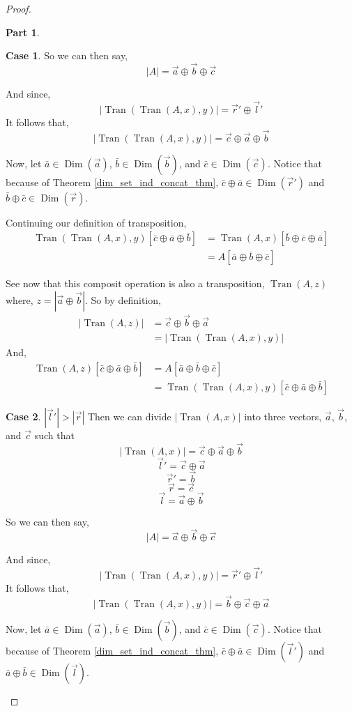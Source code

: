 \documentclass[12pt]{book}
\theoremstyle{plain}
\theoremstyle{definition}
\theoremstyle{ppart}
\newtheorem{ppart}{Part}
\theoremstyle{case}
\newtheorem{case}{Case}
\theoremstyle{solution}
\DeclareMathOperator{\Dim}{Dim}
\DeclareMathOperator{\Tran}{Tran}
\newcommand{\shape}[1]{\left|#1\right|}
\begin{document}
\begin{proof}
\begin{ppart}
\begin{case}
So we can then say,
\[ \shape{A} = \vec{a} \oplus \vec{b} \oplus \vec{c} \]

And since,
\[ \shape{\Tran(\Tran(A, x), y)} = \vec{r}' \oplus \vec{l}' \]
It follows that,
\[ \shape{\Tran(\Tran(A, x), y)} = \vec{c} \oplus \vec{a} \oplus \vec{b} \]

Now, let $\bar{a} \in \Dim(\vec{a})$, $\bar{b} \in \Dim(\vec{b})$, and
$\bar{c} \in \Dim(\vec{c})$. Notice that because of Theorem 
\ref{dim_set_ind_concat_thm}, $\bar{c} \oplus \bar{a} \in \Dim(\vec{r}')$ and
$\bar{b} \oplus \bar{c} \in \Dim(\vec{r})$.

Continuing our definition of transposition,
\begin{align*}
  \Tran(\Tran(A, x), y)[\bar{c} \oplus \bar{a} \oplus \bar{b}]
  &=
  \Tran(A, x)[\bar{b} \oplus \bar{c} \oplus \bar{a}] \\
  &=
  A[\bar{a} \oplus \bar{b} \oplus \bar{c}]
\end{align*}

See now that this composit operation is also a transposition, $\Tran(A, z)$ where,
$z = \shape{\vec{a} \oplus \vec{b}}$.
So by definition,
\begin{align*}
  \shape{\Tran(A, z)}
  &=
  \vec{c} \oplus \vec{b} \oplus \vec{a} \\
  &=
  \shape{\Tran(\Tran(A, x), y)}  
\end{align*}
And,
\begin{align*}
  \Tran(A, z)[\bar{c} \oplus \bar{a} \oplus \bar{b}]
  &=
  A[\bar{a} \oplus \bar{b} \oplus \bar{c}] \\
  &=
  \Tran(\Tran(A, x), y)[\bar{c} \oplus \bar{a} \oplus \bar{b}]
\end{align*}
\end{case}

\begin{case} $\shape{\vec{l}'} > \shape{\vec{r}}$
Then we can divide $\shape{\Tran(A,x)}$ into three vectors, $\vec{a}$, $\vec{b}$, and $\vec{c}$
such that
\[ \shape{\Tran(A,x)} = \vec{c} \oplus \vec{a} \oplus \vec{b} \]
\[ \vec{l}' = \vec{c} \oplus \vec{a} \]
\[ \vec{r}' = \vec{b} \]
\[ \vec{r} = \vec{c} \]
\[ \vec{l} = \vec{a} \oplus \vec{b} \]

So we can then say,
\[ \shape{A} = \vec{a} \oplus \vec{b} \oplus \vec{c} \]

And since,
\[ \shape{\Tran(\Tran(A, x), y)} = \vec{r}' \oplus \vec{l}' \]
It follows that,
\[ \shape{\Tran(\Tran(A, x), y)} = \vec{b} \oplus \vec{c} \oplus \vec{a} \]

Now, let $\bar{a} \in \Dim(\vec{a})$, $\bar{b} \in \Dim(\vec{b})$, and
$\bar{c} \in \Dim(\vec{c})$. Notice that because of Theorem 
\ref{dim_set_ind_concat_thm}, $\bar{c} \oplus \bar{a} \in \Dim(\vec{l}')$ and
$\bar{a} \oplus \bar{b} \in \Dim(\vec{l})$.


\end{case}
\end{ppart}
\end{proof}
\end{document}
